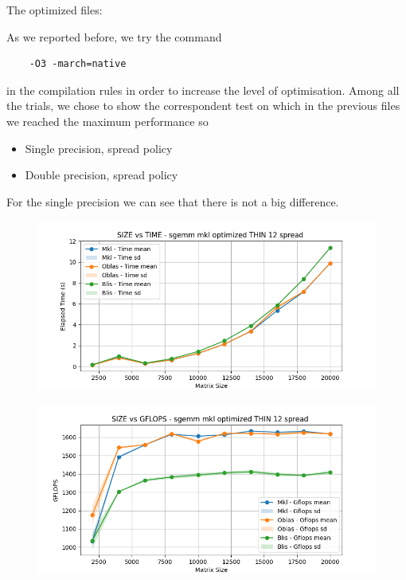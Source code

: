 \documentclass{article}
\begin{document}
The optimized files: 

As we reported before, we try the command 
\begin{verbatim}
    -O3 -march=native
\end{verbatim}
in the compilation rules in order to increase the level of optimisation. Among all the trials, we chose to show the correspondent test on which in the previous files we reached the maximum performance so 
\begin{itemize}
    \item Single precision, spread policy
    \item Double precision, spread policy
\end{itemize}

For the single precision we can see that there is not a big difference.
\begin{figure}[H]
    \centering
    \includegraphics[width=\textwidth]{THIN 12/sgemm_mkl_optimized_THIN_12_spread_time.png}
\end{figure}

\begin{figure}[H]
    \centering
    \includegraphics[width=\textwidth]{THIN 12/sgemm_mkl_optimized_THIN_12_spread_gflops.png}
\end{figure}
\end{document}
